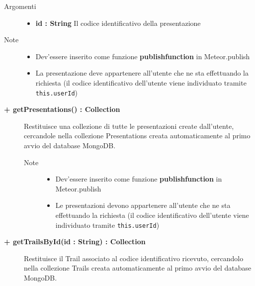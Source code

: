 \begin{description}
\begin{description}
		\begin{description}
			\item[Argomenti] \hfill
				\begin{itemize}
				
					\item \textbf{id : String			} \hfill
					Il codice identificativo della presentazione
					
				\end{itemize}
			\item[Note] \hfill
			\begin{itemize}
					\item Dev'essere inserito come funzione \textbf{publishfunction} in Meteor.publish
					\item La presentazione deve appartenere all'utente che ne sta effettuando la richiesta (il codice identificativo dell'utente viene individuato tramite \texttt{this.userId})
				\end{itemize}
		\end{description}
	\end{description}
	
	\begin{description}
		\item[\textbf{\color{blue}+ getPresentations() : Collection			}] \hfill
			Restituisce una collezione di tutte le presentazioni create dall'utente, cercandole nella collezione Presentations creata automaticamente al primo avvio del database MongoDB.
			
		\begin{description}
			
			\item[Note] \hfill
			\begin{itemize}
					\item Dev'essere inserito come funzione \textbf{publishfunction} in Meteor.publish
					\item Le presentazioni devono appartenere all'utente che ne sta effettuando la richiesta (il codice identificativo dell'utente viene individuato tramite \texttt{this.userId})
				\end{itemize}
		\end{description}
	\end{description}
	
	\begin{description}
		\item[\textbf{\color{blue}+ getTrailsById(id : String) : Collection			}] \hfill
			Restituisce il Trail associato al codice identificativo ricevuto, cercandolo nella collezione Trails creata automaticamente al primo avvio del database MongoDB.
			

\end{description}
\end{description}
